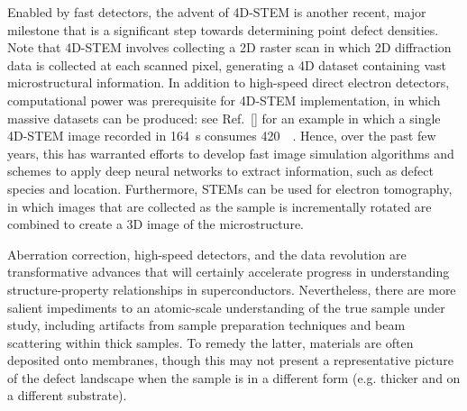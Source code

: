 \documentclass[%
 aip,
 amsmath,amssymb,
 reprint,%
floatfix]{revtex4-1}
\begin{document}
Enabled by fast detectors, the advent of 4D-STEM\cite{ophus_2019} is another recent, major milestone that is a significant step towards determining point defect densities.  Note that 4D-STEM involves collecting a 2D raster scan in which 2D diffraction data is collected at each scanned pixel, generating a 4D dataset containing vast microstructural information. In addition to high-speed direct electron detectors, computational power was prerequisite for 4D-STEM implementation, in which massive datasets can be produced: see Ref.~[] for an example in which a single 4D-STEM image recorded in \SI{164}{\second} consumes \SI{420}{\giga\byte}. Hence, over the past few years, this has warranted efforts to develop fast image simulation algorithms \cite{Ophus2017} and schemes to apply deep neural networks to extract information, such as defect species and location\cite{Ziatdinov2017}.  Furthermore, STEMs can be used for electron tomography, in which images that are collected as the sample is incrementally rotated are combined to create a 3D image of the microstructure.\cite{Miaoaaf2157}


Aberration correction, high-speed detectors, and the data revolution are transformative advances that will certainly accelerate progress in understanding structure-property relationships in superconductors. Nevertheless, there are more salient impediments to an atomic-scale understanding of the true sample under study, including artifacts from sample preparation techniques\cite{SCHAFFER2012} and beam scattering within thick samples. To remedy the latter, materials are often deposited onto membranes, though this may not present a representative picture of the defect landscape when the sample is in a different form (e.g. thicker and on a different substrate).
\end{document}

